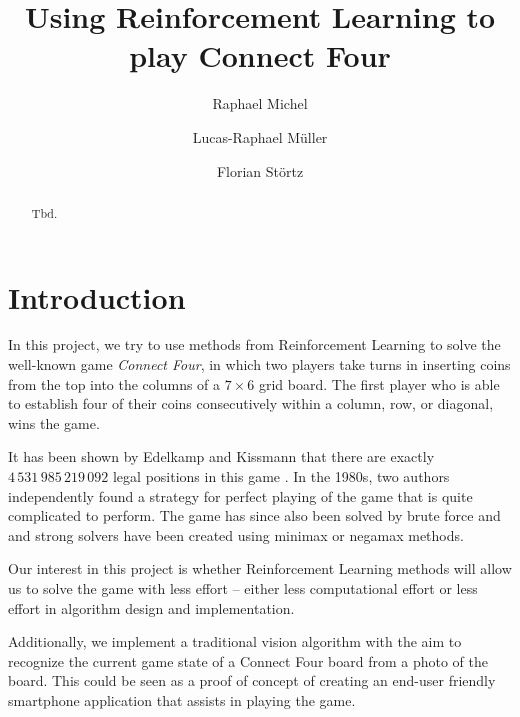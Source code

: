 \documentclass[10pt,twocolumn,letterpaper]{article}
\begin{document}
\title{Using Reinforcement Learning to play Connect Four}

\author{Raphael Michel
\and
Lucas-Raphael Müller
\and
Florian Störtz
}

\maketitle

\begin{abstract}
   Tbd.
\end{abstract}

\section{Introduction}

In this project, we try to use methods from Reinforcement Learning to solve
the well-known game \emph{Connect Four}, in which two players take turns in
inserting coins from the top into the columns of a $7\times 6$ grid board.
The first player who is able to establish four of their coins consecutively
within a column, row, or diagonal, wins the game.

It has been shown by Edelkamp and Kissmann that there are exactly $4\,531\,985\,219\,092$ legal positions in this game \cite{Edelkamp2008}. In the 1980s, two authors independently found a strategy for perfect playing of the game \cite{Allis88}\cite{Allen1990} that is quite complicated to perform. The game has since also been solved by brute force and and strong solvers have been created using minimax or negamax methods.

Our interest in this project is whether Reinforcement Learning methods will allow us to solve the game with less effort -- either less computational effort or less effort in algorithm design and implementation.

Additionally, we implement a traditional vision algorithm with the aim to
recognize the current game state of a Connect Four board from a photo of the
board. This could be seen as a proof of concept of creating an end-user friendly smartphone application that assists in playing the game.
\end{document}
